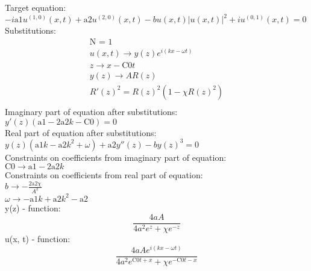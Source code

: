 \documentclass[12pt,a4paper,draft]{article}
\begin{document}
Target equation:
\\$
-i \text{a1} u^{(1,0)}(x,t)+\text{a2} u^{(2,0)}(x,t)-b u(x,t) \left| u(x,t)\right| ^2+i u^{(0,1)}(x,t)=0
$\\
Substitutions:
$$
\begin{array}{c}
 \text{N = 1} \\
 u(x,t)\to y(z) e^{i (k x-\omega  t)} \\
 z\to x-\text{C0} t \\
 y(z)\to A R(z) \\
 R'(z)^2=R(z)^2 \left(1-\chi  R(z)^2\right) \\
\end{array}
$$
Imaginary part of equation after substitutions:
\\$
y'(z) (\text{a1}-2 \text{a2} k-\text{C0})=0
$\\
Real part of equation after substitutions:
\\$
y(z) \left(\text{a1} k-\text{a2} k^2+\omega \right)+\text{a2} y''(z)-b y(z)^3=0
$\\
Constraints on coefficients from imaginary part of equation:
\\$\text{C0}\to \text{a1}-2 \text{a2} k$\\
Constraints on coefficients from real part of equation:
\\$b\to -\frac{2 \text{a2} \chi }{A^2}$\\
$\omega \to -\text{a1} k+\text{a2} k^2-\text{a2}$\\


y(z) - function:
$$
\frac{4 a A}{4 a^2 e^z+\chi  e^{-z}}
$$
u(x, t) - function:
$$
\frac{4 a A e^{i (k x-\omega  t)}}{4 a^2 e^{\text{C0} t+x}+\chi  e^{-\text{C0} t-x}}
$$
\end{document}
